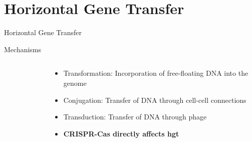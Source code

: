 \documentclass[dvipsnames]{beamer}
\begin{document}
\section{Horizontal Gene Transfer}
\begin{frame}{}
    \begin{center}
        \Huge \textcolor{OliveGreen}{Horizontal Gene Transfer}
    \end{center}
    \addtocounter{framenumber}{-1}
\end{frame}
\begin{frame}[fragile]{Mechanisms}
    \begin{columns}
    \begin{column}{0.5\textwidth}
        \begin{figure}[htb!]
            \autocite{trendslgt}
        \end{figure}
    \end{column}
    \begin{column}{0.5\textwidth}
        \begin{itemize}
            \item<2-> Transformation: Incorporation of free-floating DNA into the genome \autocite{trendslgt}
            \item<3-> Conjugation: Transfer of DNA through cell-cell connections \autocite{trendslgt}
            \item<4-> Transduction: Transfer of DNA through phage \autocite{trendslgt}
            \item<5-> \textbf{CRISPR-Cas directly affects \ac{hgt}} \autocite{trendslgt}
        \end{itemize}
    \end{column}
    \end{columns}
\end{frame}
\end{document}
